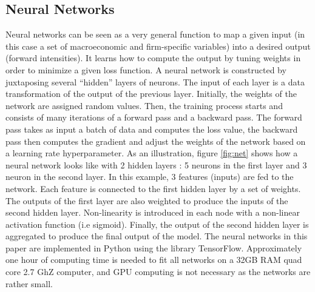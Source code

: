 \subsection{Neural Networks}
\label{SS:2-2}

Neural networks can be seen as a very general function to map a given input (in this case a set of macroeconomic and firm-specific variables) into a desired output (forward intensities). It learns how to compute the output by tuning weights in order to minimize a given loss function. A neural network is constructed by juxtaposing several ``hidden'' layers of neurons. The input of each layer is a data transformation of the output of the previous layer. Initially, the weights of the network are assigned random values. Then, the training process starts and consists of many iterations of a forward pass and a backward pass. The forward pass takes as input a batch of data and computes the loss value, the backward pass then computes the gradient and adjust the weights of the network based on a learning rate hyperparameter. As an illustration, figure \ref{fig:net} shows how a neural network looks like with 2 hidden layers : 5 neurons in the first layer and 3 neuron in the second layer. In this example, 3 features (inputs) are fed to the network. Each feature is connected to the first hidden layer by a set of weights. The outputs of the first layer are also weighted to produce the inputs of the second hidden layer. Non-linearity is introduced in each node with a non-linear activation function (i.e sigmoid). Finally, the output of the second hidden layer is aggregated to produce the final output of the model. The neural networks in this paper are implemented in Python using the library TensorFlow. Approximately one hour of computing time is needed to fit all networks on a 32GB RAM quad core 2.7 GhZ computer, and GPU computing is not necessary as the networks are rather small.

